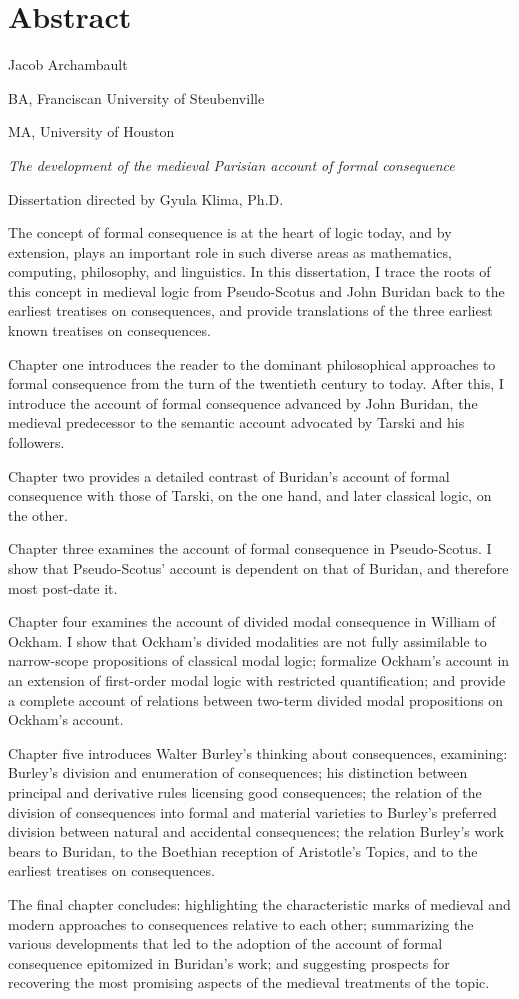 \chapter{Abstract}
Jacob Archambault

\indent BA, Franciscan University of Steubenville

\indent MA, University of Houston

\indent \textit{The development of the medieval Parisian account of formal consequence}

\noindent Dissertation directed by Gyula Klima, Ph.D.
\bigskip

The concept of formal consequence is at the heart of logic today, and by extension, plays an important role in such diverse areas as mathematics, computing, philosophy, and linguistics. In this dissertation, I trace the roots of this concept in medieval logic from Pseudo-Scotus and John Buridan back to the earliest treatises on consequences, and provide translations of the three earliest known treatises on consequences.

Chapter one introduces the reader to the dominant philosophical approaches to formal consequence from the turn of the twentieth century to today. After this, I introduce the account of formal consequence advanced by John Buridan, the medieval predecessor to the semantic account advocated by Tarski and his followers. 

Chapter two provides a detailed contrast of Buridan's account of formal consequence with those of Tarski, on the one hand, and later classical logic, on the other. 

Chapter three examines the account of formal consequence in Pseudo-Scotus. I show that Pseudo-Scotus' account is dependent on that of Buridan, and therefore most post-date it. 

Chapter four examines the account of divided modal consequence in William of Ockham. I show that Ockham's divided modalities are not fully assimilable to narrow-scope propositions of classical modal logic; formalize Ockham's account in an extension of first-order modal logic with restricted quantification; and provide a complete account of relations between two-term divided modal propositions on Ockham's account. 

Chapter five introduces Walter Burley's thinking about consequences, examining: Burley's division and enumeration of consequences; his distinction between principal and derivative rules licensing good consequences; the relation of the division of consequences into formal and material varieties to Burley's preferred division between natural and accidental consequences; the relation Burley's work bears to Buridan, to the Boethian reception of Aristotle's Topics, and to the earliest treatises on consequences. 

The final chapter concludes: highlighting the characteristic marks of medieval and modern approaches to consequences relative to each other; summarizing the various developments that led to the adoption of the account of formal consequence epitomized in Buridan's work; and suggesting prospects for recovering the most promising aspects of the medieval treatments of the topic.
